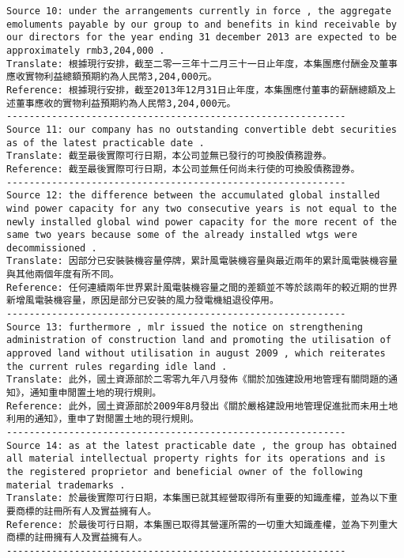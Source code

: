 \documentclass[11pt]{article}
\begin{document}
    \begin{Verbatim}[commandchars=\\\{\}]
Source 10: under the arrangements currently in force , the aggregate emoluments payable by our group to and benefits in kind receivable by our directors for the year ending 31 december 2013 are expected to be approximately rmb3,204,000 .
Translate: 根據現行安排，截至二零一三年十二月三十一日止年度，本集團應付酬金及董事應收實物利益總額預期約為人民幣3,204,000元。
Reference: 根據現行安排，截至2013年12月31日止年度，本集團應付董事的薪酬總額及上述董事應收的實物利益預期約為人民幣3,204,000元。
------------------------------------------------------------
Source 11: our company has no outstanding convertible debt securities as of the latest practicable date .
Translate: 截至最後實際可行日期，本公司並無已發行的可換股債務證券。
Reference: 截至最後實際可行日期，本公司並無任何尚未行使的可換股債務證券。
------------------------------------------------------------
Source 12: the difference between the accumulated global installed wind power capacity for any two consecutive years is not equal to the newly installed global wind power capacity for the more recent of the same two years because some of the already installed wtgs were decommissioned .
Translate: 因部分已安裝裝機容量停牌，累計風電裝機容量與最近兩年的累計風電裝機容量與其他兩個年度有所不同。
Reference: 任何連續兩年世界累計風電裝機容量之間的差額並不等於該兩年的較近期的世界新增風電裝機容量，原因是部分已安裝的風力發電機組退役停用。
------------------------------------------------------------
Source 13: furthermore , mlr issued the notice on strengthening administration of construction land and promoting the utilisation of approved land without utilisation in august 2009 , which reiterates the current rules regarding idle land .
Translate: 此外，國土資源部於二零零九年八月發佈《關於加強建設用地管理有關問題的通知》，通知重申閒置土地的現行規則。
Reference: 此外，國土資源部於2009年8月發出《關於嚴格建設用地管理促進批而未用土地利用的通知》，重申了對閒置土地的現行規則。
------------------------------------------------------------
Source 14: as at the latest practicable date , the group has obtained all material intellectual property rights for its operations and is the registered proprietor and beneficial owner of the following material trademarks .
Translate: 於最後實際可行日期，本集團已就其經營取得所有重要的知識產權，並為以下重要商標的註冊所有人及實益擁有人。
Reference: 於最後可行日期，本集團已取得其營運所需的一切重大知識產權，並為下列重大商標的註冊擁有人及實益擁有人。
------------------------------------------------------------

    \end{Verbatim}


    
    
    
    
\end{document}

